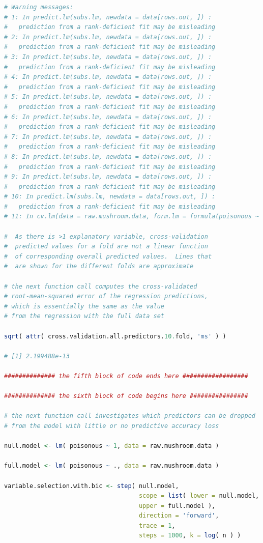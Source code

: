 \documentclass[12pt]{article}
\begin{document}
\begin{lstlisting}[language = R]
# Warning messages:
# 1: In predict.lm(subs.lm, newdata = data[rows.out, ]) :
#   prediction from a rank-deficient fit may be misleading
# 2: In predict.lm(subs.lm, newdata = data[rows.out, ]) :
#   prediction from a rank-deficient fit may be misleading
# 3: In predict.lm(subs.lm, newdata = data[rows.out, ]) :
#   prediction from a rank-deficient fit may be misleading
# 4: In predict.lm(subs.lm, newdata = data[rows.out, ]) :
#   prediction from a rank-deficient fit may be misleading
# 5: In predict.lm(subs.lm, newdata = data[rows.out, ]) :
#   prediction from a rank-deficient fit may be misleading
# 6: In predict.lm(subs.lm, newdata = data[rows.out, ]) :
#   prediction from a rank-deficient fit may be misleading
# 7: In predict.lm(subs.lm, newdata = data[rows.out, ]) :
#   prediction from a rank-deficient fit may be misleading
# 8: In predict.lm(subs.lm, newdata = data[rows.out, ]) :
#   prediction from a rank-deficient fit may be misleading
# 9: In predict.lm(subs.lm, newdata = data[rows.out, ]) :
#   prediction from a rank-deficient fit may be misleading
# 10: In predict.lm(subs.lm, newdata = data[rows.out, ]) :
#   prediction from a rank-deficient fit may be misleading
# 11: In cv.lm(data = raw.mushroom.data, form.lm = formula(poisonous ~  ... : 

#  As there is >1 explanatory variable, cross-validation
#  predicted values for a fold are not a linear function
#  of corresponding overall predicted values.  Lines that
#  are shown for the different folds are approximate

# the next function call computes the cross-validated
# root-mean-squared error of the regression predictions,
# which is essentially the same as the value
# from the regression with the full data set

sqrt( attr( cross.validation.all.predictors.10.fold, 'ms' ) )

# [1] 2.199488e-13

############## the fifth block of code ends here ##################

############## the sixth block of code begins here ################

# the next function call investigates which predictors can be dropped
# from the model with little or no predictive accuracy loss

null.model <- lm( poisonous ~ 1, data = raw.mushroom.data )

full.model <- lm( poisonous ~ ., data = raw.mushroom.data )

variable.selection.with.bic <- step( null.model,
                                     scope = list( lower = null.model, 
                                     upper = full.model ), 
                                     direction = 'forward', 
                                     trace = 1, 
                                     steps = 1000, k = log( n ) )


\end{lstlisting}
\end{document}
